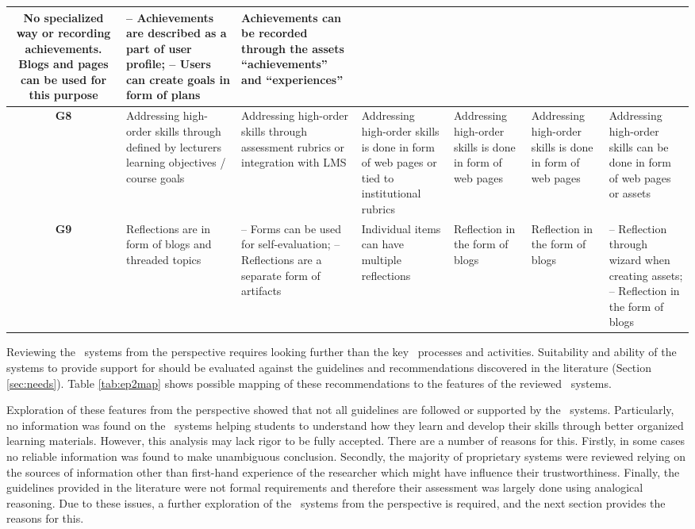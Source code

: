 \begin{sidewaystable}
\begin{tabular}{|c|p{3.25cm}|p{3.25cm}|p{3.25cm}|p{3.25cm}|p{3.25cm}|p{3.25cm}|}
	No specialized way or recording achievements. Blogs and pages can be used for
	this purpose & 
	-- Achievements are described as a part of user profile; \newline -- Users can
	create goals in form of plans & 
	Achievements can be recorded through the assets ``achievements''
	and ``experiences''	\\ \hline 
	\textbf{G8} & 
	Addressing high-order skills through defined by lecturers learning
	objectives / course goals & 
	Addressing high-order skills through assessment rubrics or integration with LMS
	& 
	Addressing high-order skills is done in form of web pages or tied to
	institutional rubrics & 
	Addressing high-order skills is done in form of web pages & 
	Addressing high-order skills is done in form of web pages & 
	Addressing high-order skills can be done in form of web pages or assets \\
	\hline 
	\textbf{G9} & 
	Reflections are in form of blogs and threaded topics & 
	-- Forms can be used for self-evaluation; \newline -- Reflections are a
	separate form of artifacts & 
	Individual items can have multiple reflections & 
	Reflection in the form of blogs & 
	Reflection in the form of blogs & 
	-- Reflection through wizard when creating assets; \newline -- Reflection in
	the form of blogs \\ \hline
	\end{tabular}
\label{tab:ep2map} 
\end{sidewaystable} 

Reviewing the \ep~systems from the \LLLs perspective requires looking further
than the key \ep~processes and activities. Suitability and ability of the
systems to provide support for \LLLs should be evaluated against the guidelines
and recommendations discovered in the literature (Section \ref{sec:needs}). Table
\ref{tab:ep2map} shows possible mapping of these recommendations to the features
of the reviewed \ep~systems. 

Exploration of these features from the \LLLs perspective showed that not all
guidelines are followed or supported by the \ep~systems. Particularly, no
information was found on the \ep~systems helping students to understand how they
learn and develop their skills through better organized learning materials.
However, this analysis may lack rigor to be fully accepted. There are a number
of reasons for this. Firstly, in some cases no reliable information was found to
make unambiguous conclusion. Secondly, the majority of proprietary systems were
reviewed relying on the sources of information other than first-hand experience
of the researcher which might have influence their trustworthiness. Finally, the
guidelines provided in the literature were not formal requirements and therefore
their assessment was largely done using analogical reasoning. Due to these
issues, a further exploration of the \ep~systems from the \LLLs perspective is
required, and the next section provides the reasons for this.

